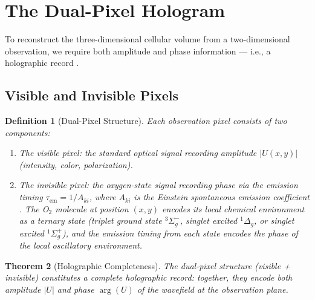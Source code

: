 \documentclass[11pt,twocolumn,a4paper]{article}
\newtheorem{theorem}{Theorem}[section]
\newtheorem{definition}[theorem]{Definition}
\newcommand{\tauem}{\tau_{\mathrm{em}}}
\begin{document}

\section{The Dual-Pixel Hologram}
\label{sec:dual-pixel}

To reconstruct the three-dimensional cellular volume from a
two-dimensional observation, we require both amplitude and phase
information --- i.e., a holographic record \citep{gabor1948}.

\subsection{Visible and Invisible Pixels}

\begin{definition}[Dual-Pixel Structure]
\label{def:dual-pixel}
Each observation pixel consists of two components:
\begin{enumerate}[label=(\roman*),leftmargin=*]
\item The \emph{visible pixel}: the standard optical signal recording
  amplitude $|U(x,y)|$ (intensity, color, polarization).
\item The \emph{invisible pixel}: the oxygen-state signal recording
  phase via the emission timing
  $\tauem = 1/A_{ki}$, where $A_{ki}$ is the Einstein spontaneous
  emission coefficient \citep{einstein1917}. The O$_2$ molecule at
  position $(x,y)$ encodes its local chemical environment as a ternary
  state (triplet ground state ${}^3\Sigma_g^-$, singlet excited
  ${}^1\Delta_g$, or singlet excited ${}^1\Sigma_g^+$), and the
  emission timing from each state encodes the phase of the local
  oscillatory environment.
\end{enumerate}
\end{definition}

\begin{theorem}[Holographic Completeness]
\label{thm:holographic}
The dual-pixel structure (visible + invisible) constitutes a complete
holographic record: together, they encode both amplitude $|U|$ and
phase $\arg(U)$ of the wavefield at the observation plane.
\end{theorem}
\end{document}
